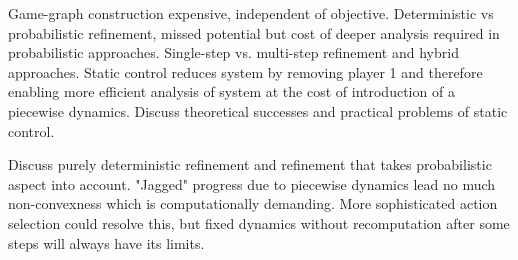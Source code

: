\stopsubsection


\startsubsection[title={Reduction Approaches}]

    Game-graph construction expensive, independent of objective.
    Deterministic vs probabilistic refinement, missed potential but cost of deeper analysis required in probabilistic approaches.
    Single-step vs. multi-step refinement and hybrid approaches.
    Static control reduces system by removing player 1 and therefore enabling more efficient analysis of system at the cost of introduction of a piecewise dynamics.
    Discuss theoretical successes and practical problems of static control.

    Discuss purely deterministic refinement and refinement that takes probabilistic aspect into account.
    "Jagged" progress due to piecewise dynamics lead no much non-convexness which is computationally demanding.
    More sophisticated action selection could resolve this, but fixed dynamics without recomputation after some steps will always have its limits.

\stopsubsection

